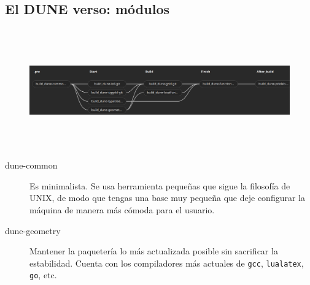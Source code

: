\subsection{El DUNE verso: módulos}
\begin{frame}
	\frametitle{\secname}
	\framesubtitle{\subsecname}

	\begin{figure}[ht!]
	\centering
	\includegraphics[height=5cm]{dependences.png}
	\end{figure}

	\begin{description}
		\item[dune-common]
			Es minimalista.
			Se usa herramienta pequeñas que sigue la filosofía de UNIX, de modo que tengas una base muy pequeña que deje configurar la máquina de manera más cómoda para el usuario.
		\item[dune-geometry]
			Mantener la paquetería lo más actualizada posible sin sacrificar la estabilidad. Cuenta con los compiladores más actuales de \lstinline{gcc}, \lstinline{lualatex}, \lstinline{go}, etc.
	\end{description}

\end{frame}

{
\begin{frame}[plain]
\end{frame}
}

